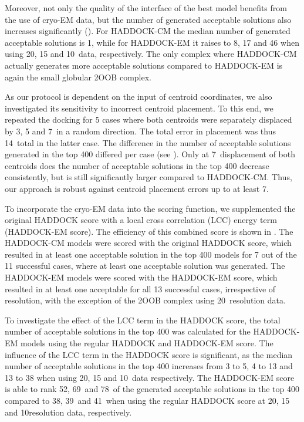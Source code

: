 Moreover, not only the quality of the interface of the best model benefits from
the use of cryo-EM data, but the number of generated acceptable solutions also
increases significantly (). For HADDOCK-CM the
median number of generated acceptable solutions is 1, while for HADDOCK-EM it
raises to 8, 17 and 46 when using 20, 15 and 10\Angstrom\ data, respectively. The
only complex where HADDOCK-CM actually generates more acceptable solutions
compared to HADDOCK-EM is again the small globular 2OOB complex.

As our protocol is dependent on the input of centroid coordinates, we also
investigated its sensitivity to incorrect centroid placement.  To this end, we
repeated the docking for 5 cases where both centroids were separately displaced
by 3, 5 and 7\Angstrom\ in a random direction.  The total error in placement
was thus 14\Angstrom\ total in the latter case. The difference in the number of
acceptable solutions generated in the top 400 differed per case (see
).  Only at 7\Angstrom\ displacement of
both centroids does the number of acceptable solutions in the top 400 decrease
consistently, but is still significantly larger compared to HADDOCK-CM.  Thus,
our approach is robust against centroid placement errors up to at least
7\Angstrom.



{}

To incorporate the cryo-EM data into the scoring function, we supplemented the
original HADDOCK score with a local cross correlation (LCC) energy term
(HADDOCK-EM score).  The efficiency of this combined score is shown in
.  The HADDOCK-CM models were scored with the
original HADDOCK score, which resulted in at least one acceptable solution in
the top 400 models for 7 out of the 11 successful cases, where at least one
acceptable solution was generated.  The HADDOCK-EM models were scored with the
HADDOCK-EM score, which resulted in at least one acceptable for all 13
successful cases, irrespective of resolution, with the exception of the 2OOB
complex using 20\Angstrom\ resolution data. 

To investigate the effect of the LCC term in the HADDOCK score, the total
number of acceptable solutions in the top 400 was calculated for the HADDOCK-EM
models using the regular HADDOCK and HADDOCK-EM score.  The influence of the
LCC term in the HADDOCK score is significant, as the median number of
acceptable solutions in the top 400 increases from 3 to 5, 4 to 13 and 13 to 38
when using 20, 15 and 10\Angstrom\ data respectively.  The HADDOCK-EM score is
able to rank 52\percent, 69\percent\ and 78\percent\ of the generated acceptable solutions in the
top 400 compared to 38\percent, 39\percent\ and 41\percent\ when using the regular HADDOCK score at
20, 15 and 10\Angstrom resolution data, respectively.

